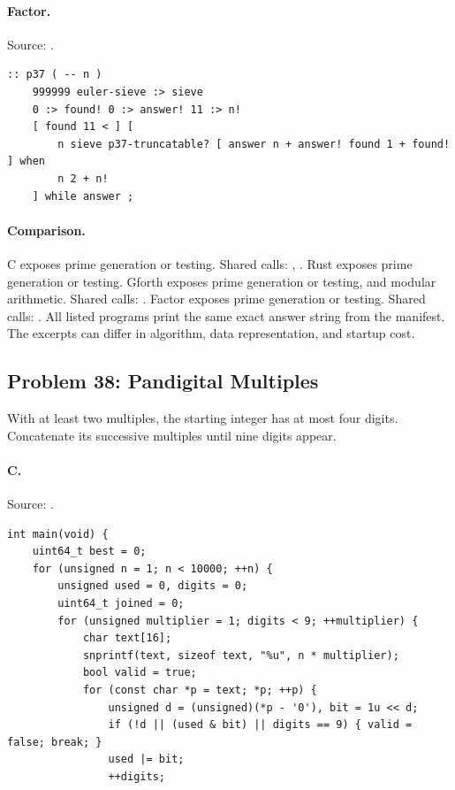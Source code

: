 \paragraph{Factor.} Source: .
\begin{lstlisting}
:: p37 ( -- n )
    999999 euler-sieve :> sieve
    0 :> found! 0 :> answer! 11 :> n!
    [ found 11 < ] [
        n sieve p37-truncatable? [ answer n + answer! found 1 + found! ] when
        n 2 + n!
    ] while answer ;
\end{lstlisting}

\paragraph{Comparison.}
C exposes prime generation or testing. Shared calls: \texttt{}, \texttt{}. Rust exposes prime generation or testing. Gforth exposes prime generation or testing, and modular arithmetic. Shared calls: \texttt{}. Factor exposes prime generation or testing. Shared calls: \texttt{}.
All listed programs print the same exact answer string from the manifest. The excerpts can differ in algorithm, data representation, and startup cost.

\subsection{Problem 38: Pandigital Multiples}
\label{walkthrough:p38}
With at least two multiples, the starting integer has at most four digits. Concatenate its successive multiples until nine digits appear.

\paragraph{C.} Source: .
\begin{lstlisting}
int main(void) {
    uint64_t best = 0;
    for (unsigned n = 1; n < 10000; ++n) {
        unsigned used = 0, digits = 0;
        uint64_t joined = 0;
        for (unsigned multiplier = 1; digits < 9; ++multiplier) {
            char text[16];
            snprintf(text, sizeof text, "%u", n * multiplier);
            bool valid = true;
            for (const char *p = text; *p; ++p) {
                unsigned d = (unsigned)(*p - '0'), bit = 1u << d;
                if (!d || (used & bit) || digits == 9) { valid = false; break; }
                used |= bit;
                ++digits;
\end{lstlisting}

